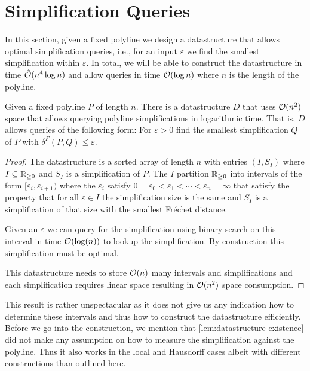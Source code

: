 \section{Simplification Queries}
\label{sec:simplification-queries}

In this section, given a fixed polyline we design a datastructure that allows optimal simplification queries, i.e., for 
an input \(\varepsilon\) we find the smallest simplification within \(\varepsilon\). In total, we will be able to construct the datastructure in time \(\hat{\mathcal{O}}(n^4\log n)\) and allow queries in time \(\mathcal{O}(\log n)\) where \(n\) is the length of the polyline.

\begin{lemma}\label{lem:datastructure-existence}
  Given a fixed polyline \(P\) of length \(n\). There is a datastructure \(D\) that uses \(\mathcal{O}(n^2)\) space that allows querying polyline simplifications in logarithmic time. That is, \(D\) allows queries of the following form: For \(\varepsilon > 0\) find the smallest simplification \(Q\) of \(P\) with \(\delta^F(P, Q) \leq \varepsilon\).
\end{lemma}

\begin{proof}
  The datastructure is a sorted array of length \(n\) with entries \((I, S_I)\) where \(I \subseteq \mathbb{R}_{\geq 0}\) and \(S_I\) is a simplification of \(P\). The \(I\) partition \(\mathbb{R}_{\geq 0}\) into intervals of the form \([\varepsilon_i, \varepsilon_{i+1})\) where the \(\varepsilon_i\) satisfy \(0 = \varepsilon_0 < \varepsilon_1 < \cdots < \varepsilon_{n} = \infty\) that satisfy the property that for all \(\varepsilon \in I\) the simplification size is the same and \(S_I\) is a simplification of that size with the smallest Fréchet distance. 

	Given an \(\varepsilon\) we can query for the simplification using binary search on this interval in time \(\mathcal{O}(\log(n))\) to lookup the simplification. By construction this simplification must be optimal.

	This datastructure needs to store \(\mathcal{O}(n)\) many intervals and simplifications and each simplification requires linear space resulting in \(\mathcal{O}(n^2)\) space consumption.
\end{proof}

This result is rather unspectacular as it does not give us any indication how to determine these intervals and thus how to construct the datastructure efficiently. Before we go into the construction, we mention that \cref{lem:datastructure-existence} did not make any assumption on how to measure the simplification against the polyline. Thus it also works in the local and Hausdorff cases albeit with different constructions than outlined here. 


